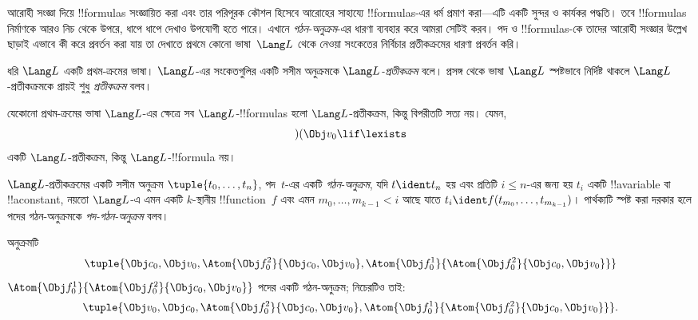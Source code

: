 \documentclass[../../../include/open-logic-section]{subfiles}
\begin{document}


আরোহী সংজ্ঞা দিয়ে !!{formula}s সংজ্ঞায়িত করা এবং তার পরিপূরক কৌশল
হিসেবে আরোহের সাহায্যে !!{formula}s-এর ধর্ম প্রমাণ করা—এটি একটি সুন্দর
ও কার্যকর পদ্ধতি। তবে !!{formula}s নির্মাণকে আরও নিচ থেকে উপরে,
ধাপে ধাপে দেখাও উপযোগী হতে পারে। এখানে \emph{গঠন-অনুক্রম}-এর ধারণা
ব্যবহার করে আমরা সেটিই করব।
%
পদ ও !!{formula}s-কে তাদের আরোহী সংজ্ঞার উল্লেখ ছাড়াই এভাবে কী করে
প্রবর্তন করা যায় তা দেখাতে প্রথমে কোনো ভাষা~$\Lang L$ থেকে নেওয়া
সংকেতের নির্বিচার প্রতীকক্রমের ধারণা প্রবর্তন করি।

\begin{defn}[প্রতীকক্রম]
ধরি $\Lang L$ একটি প্রথম-ক্রমের ভাষা। $\Lang L$-এর সংকেতগুলির একটি
সসীম অনুক্রমকে \emph{$\Lang L$-প্রতীকক্রম} বলে। প্রসঙ্গ থেকে ভাষা
$\Lang L$ স্পষ্টভাবে নির্দিষ্ট থাকলে $\Lang L$-প্রতীকক্রমকে প্রায়ই
শুধু \emph{প্রতীকক্রম} বলব।
\end{defn}

\begin{ex}
যেকোনো প্রথম-ক্রমের ভাষা $\Lang L$-এর ক্ষেত্রে সব $\Lang
L$-!!{formula}s হলো $\Lang L$-প্রতীকক্রম, কিন্তু বিপরীতটি সত্য নয়।
যেমন, \[)(\Obj v_0\lif\lexists\] একটি $\Lang L$-প্রতীকক্রম, কিন্তু
$\Lang L$-!!{formula} নয়।
\end{ex}

\begin{defn}[পদের গঠন-অনুক্রম]
$\Lang L$-প্রতীকক্রমের একটি সসীম অনুক্রম
$\tuple{t_0,\dotsc,t_n}$, পদ~$t$-এর একটি \emph{গঠন-অনুক্রম}, যদি
$t \ident t_n$ হয় এবং প্রতিটি $i \leq n$-এর জন্য হয় $t_i$ একটি
!!a{variable} বা !!a{constant}, নয়তো $\Lang L$-এ এমন একটি $k$-স্থানীয়
!!{function}~$f$ এবং এমন $m_0,\dotsc,m_{k-1} < i$ আছে যাতে
$t_i \ident f(t_{m_0},\dotsc,t_{m_{k-1}})$। পার্থক্যটি স্পষ্ট করা
দরকার হলে পদের গঠন-অনুক্রমকে \emph{পদ-গঠন-অনুক্রম} বলব।
\end{defn}


\begin{ex}
অনুক্রমটি
\[
    \tuple{\Obj c_0, \Obj v_0, \Atom{\Obj f^2_0}{\Obj c_0, \Obj v_0}, \Atom{\Obj f^1_0}{\Atom{\Obj f^2_0}{\Obj c_0, \Obj v_0}}}
\]
$\Atom{\Obj f^1_0}{\Atom{\Obj f^2_0}{\Obj c_0, \Obj v_0}}$ পদের একটি
গঠন-অনুক্রম; নিচেরটিও তাই:
\[
    \tuple{\Obj v_0, \Obj c_0, \Atom{\Obj f^2_0}{\Obj c_0, \Obj v_0}, \Atom{\Obj f^1_0}{\Atom{\Obj f^2_0}{\Obj c_0, \Obj v_0}}}.
\]
\end{ex}
\end{document}

